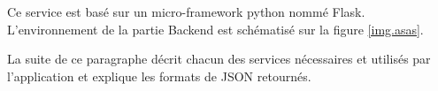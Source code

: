 Ce service est basé sur un micro-framework python nommé Flask. L'environnement de la partie Backend est schématisé sur la figure \ref{img.asas}.



La suite de ce paragraphe décrit chacun des services nécessaires et utilisés par l'application et explique les formats de JSON retournés.


\newpage


    
